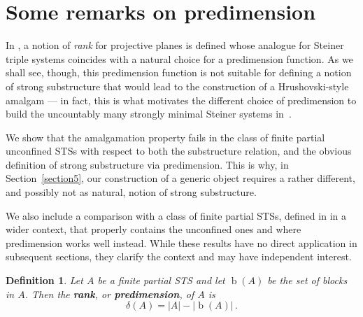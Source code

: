 \documentclass[a4paper, 11pt]{article}
\DeclareMathOperator{\bl}{b}
\theoremstyle{note}
\newtheorem{df}[thm]{Definition}
\begin{document}
	
	
\section{Some remarks on predimension} \label{section4}

In \cite{hall}, a notion of \textit{rank} for projective planes is defined whose analogue for Steiner triple systems coincides with a natural choice for a predimension function. As we shall see, though, this predimension function is not suitable for defining a notion of strong substructure that would lead to the construction of a Hrushovski-style amalgam --- in fact, this is what motivates the different choice of predimension to build the uncountably many strongly minimal Steiner systems in~\cite{baldwin-pao}.

We show that the amalgamation property fails in the class of finite partial unconfined STSs with respect to both the substructure relation, and the obvious definition of strong substructure via predimension. This is why, in Section~\ref{section5}, our construction of a generic object requires a rather different, and possibly not as natural, notion of strong substructure. 

We also include a comparison with a class of finite partial STSs, defined in \cite{evans} in a wider context, that properly contains the unconfined ones and where predimension works well instead. 
While these results have no direct application in subsequent sections, they clarify the context and may have independent interest.


\begin{df} \label{dfpredim} Let $A$ be a finite partial STS and let $\bl(A)$ be the set of blocks in $A$. Then the \textbf{rank}, or \textbf{predimension}, of $A$ is
\[ \delta(A)= |A|-|\bl(A)| \, .\]
\end{df}
\end{document}
